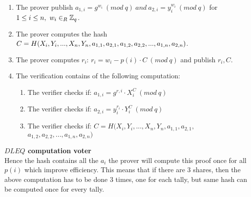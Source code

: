 \begin{enumerate}
    \item The prover publish  \begin{math}a_{1,i}=g^{w_i} \ (mod\ q)  \ and \ a_{2,i}=y_i^{w_i} \ (mod\ q)\end{math}  for  \begin{math} 1\leq i \leq n, \ w_i\in_R \mathbb{Z}_q \end{math}.
    \item The prover computes the hash \begin{math}C=H(X_i,Y_i,...,X_n,Y_n,a_{1,1},a_{2,1},\\a_{1,2},a_{2,2},...,a_{1,n},a_{2,n})\end{math}.
    \item The prover computes \begin{math}r_i\end{math}:  \begin{math}r_i=w_i-p(i)  \cdot  C \ (mod\ q)\end{math} and publish \begin{math}r_i,C\end{math}.
    \item The verification contains of the following computation:
    \begin{enumerate}        
        \item The verifier checks if:   \begin{math}a_{1,i} = g^{r,i} \cdot X_i^C \ (mod\ q) \end{math}
        \item The verifier checks if:  \begin{math} a_{2,i}=y_i^{r_{i}}  \cdot  Y_i^C \ (mod\ q)\end{math}
         \item The verifier checks if:  $C=H(X_i,Y_i,...,X_n,Y_n,a_{1,1},a_{2,1},$\\
$a_{1,2},a_{2,2},...,a_{1,n},a_{2,n})$
    \end{enumerate}
\end{enumerate}

\noindent 
\textbf{$DLEQ$ computation voter}\\
Hence the hash contains all the  \begin{math}a_i \end{math} the prover will compute this proof once for all  \begin{math}p(i) \end{math} which improve efficiency. This means that if there are $3$ shares, then the above computation has to be done $3$ times, one for each tally, but same hash can be computed once for every tally. 



